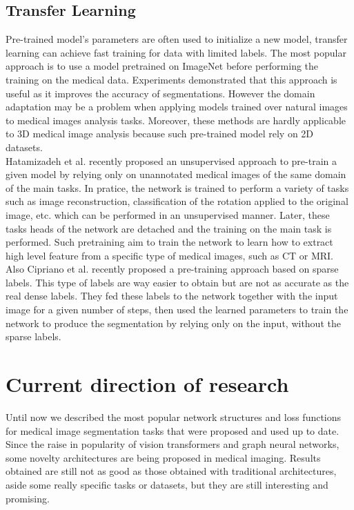 \subsection{Transfer Learning}
Pre-trained model's parameters are often used to initialize a new model,
transfer learning can achieve fast training for data with limited labels. The
most popular approach is to use a model pretrained on ImageNet before performing
the training on the medical data. Experiments demonstrated that this approach is
useful as it improves the accuracy of segmentations. However the domain
adaptation may be a problem when applying models trained over natural images to
medical images analysis tasks. Moreover, these methods are hardly applicable to
3D medical image analysis because such pre-trained model rely on 2D datasets.\\
Hatamizadeh et al. recently proposed an unsupervised approach to pre-train a
given model by relying only on unannotated medical images of the same domain of
the main tasks. In pratice, the network is trained to perform a variety of tasks
such as image reconstruction, classification of the rotation applied to the
original image, etc. which can be performed in an unsupervised manner. Later,
these tasks heads of the network are detached and the training on the main task
is performed. Such pretraining aim to train the network to learn how to extract
high level feature from a specific type of medical images, such as CT or MRI.\\
Also Cipriano et al. recently proposed a pre-training approach based on sparse labels.
This type of labels are way easier to obtain but are not as accurate as the
real dense labels. They fed these labels to the network together with the input
image for a given number of steps, then used the learned parameters to train the
network to produce the segmentation by relying only on the input, without the
sparse labels.


\section{Current direction of research}
Until now we described the most popular network structures and loss functions
for medical image segmentation tasks that were proposed and used up to date.
Since the raise in popularity of vision transformers and graph neural networks,
some novelty architectures are being proposed in medical imaging. Results
obtained are still not as good as those obtained with traditional architectures,
aside some really specific tasks or datasets, but they are still interesting and
promising.\\

